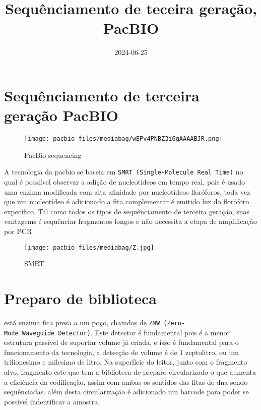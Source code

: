 \documentclass[
  letterpaper,
  DIV=11,
  numbers=noendperiod]{scrartcl}
\title{Sequênciamento de teceira geração, PacBIO}
\author{}
\date{2024-06-25}
\begin{document}
\maketitle

\section{Sequênciamento de terceira geração
PacBIO}\label{sequuxeanciamento-de-terceira-gerauxe7uxe3o-pacbio}

\begin{figure}[H]

{\centering \texttt{[image: pacbio\_files/mediabag/wEPv4PNBZ3i6gAAAABJR.png]}

}

\caption{PacBio sequencing}

\end{figure}%

A tecnologia da pacbio se baseia em
\texttt{SMRT\ (Single-Molecule\ Real\ Time)} no qual é possiível
observar a adição de nucleotideos em tempo real, pois é usado uma enzima
modificada com alta afinidade por nucleotídeos floróforos, toda vez que
um nucleotídeo é adicionado a fita complementar é emitido luz do
floróforo expecífico. Tal como todos os tipos de sequênciamento de
terceira geração, suas vantagems é sequênciar fragmentos longos e não
necessita a etapa de amplificação por PCR

\begin{figure}[H]

{\centering \texttt{[image: pacbio\_files/mediabag/Z.jpg]}

}

\caption{SMRT}

\end{figure}%

\section{Preparo de biblioteca}\label{preparo-de-biblioteca}

está enzima fica presa a um poço, chamdos de
\texttt{ZMW\ (Zero-Mode\ Waveguide\ Detector)}. Este detector é
fundamental pois é a menor estrutura passível de suportar volume já
criada, e isso é fundamental para o funcionamento da tecnologia, a
detecção de volume é de 1 zeptolitro, ou um trilionesimo e milesimo de
litro. Na superfície do leitor, junto com o fragmento alvo, fragmento
este que tem a biblioteca de preparo circularizado o que aumenta a
eficiência da codificação, assim com ambas os sentidos das fitas de dna
sendo sequênciadas. além desta circularização é adicionado um barcode
para poder se possível indentificar a amostra.
\end{document}

